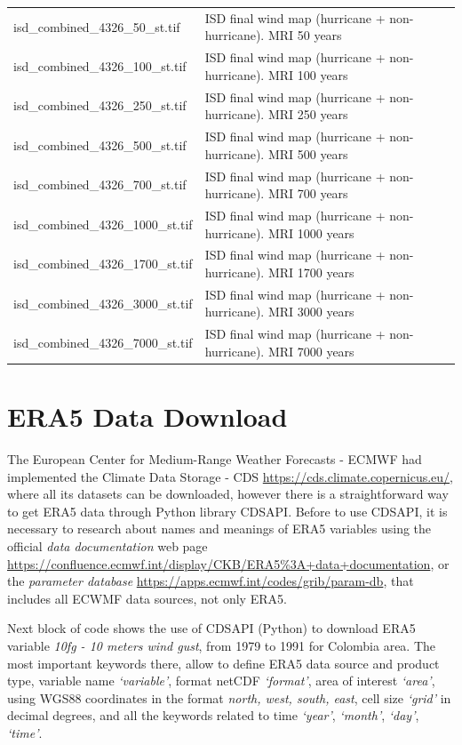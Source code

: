 \documentclass[12pt,oneside]{reedthesis}
\begin{document}
\begin{longtable}[t]{>{\raggedright\arraybackslash}p{2in}>{\raggedright\arraybackslash}p{3.5in}}
isd\_combined\_4326\_50\_st.tif & ISD final wind map (hurricane + non-hurricane). MRI 50 years\\
isd\_combined\_4326\_100\_st.tif & ISD final wind map (hurricane + non-hurricane). MRI 100 years\\
isd\_combined\_4326\_250\_st.tif & ISD final wind map (hurricane + non-hurricane). MRI 250 years\\
isd\_combined\_4326\_500\_st.tif & ISD final wind map (hurricane + non-hurricane). MRI 500 years\\
isd\_combined\_4326\_700\_st.tif & ISD final wind map (hurricane + non-hurricane). MRI 700 years\\
isd\_combined\_4326\_1000\_st.tif & ISD final wind map (hurricane + non-hurricane). MRI 1000 years\\
isd\_combined\_4326\_1700\_st.tif & ISD final wind map (hurricane + non-hurricane). MRI 1700 years\\
isd\_combined\_4326\_3000\_st.tif & ISD final wind map (hurricane + non-hurricane). MRI 3000 years\\
isd\_combined\_4326\_7000\_st.tif & ISD final wind map (hurricane + non-hurricane). MRI 7000 years\\
\bottomrule
\end{longtable}
\endgroup{}

\hypertarget{datadownload}{%
\chapter{ERA5 Data Download}\label{datadownload}}

The European Center for Medium-Range Weather Forecasts - ECMWF had implemented the Climate Data Storage - CDS \url{https://cds.climate.copernicus.eu/}, where all its datasets can be downloaded, however there is a straightforward way to get ERA5 data through Python library CDSAPI. Before to use CDSAPI, it is necessary to research about names and meanings of ERA5 variables using the official \emph{data documentation} web page \url{https://confluence.ecmwf.int/display/CKB/ERA5\%3A+data+documentation}, or the \emph{parameter database} \url{https://apps.ecmwf.int/codes/grib/param-db}, that includes all ECWMF data sources, not only ERA5.

Next block of code shows the use of CDSAPI (Python) to download ERA5 variable \emph{10fg - 10 meters wind gust}, from 1979 to 1991 for Colombia area. The most important keywords there, allow to define ERA5 data source and product type, variable name \emph{`variable'}, format netCDF \emph{`format'}, area of interest \emph{`area'}, using WGS88 coordinates in the format \emph{north, west, south, east}, cell size \emph{`grid'} in decimal degrees, and all the keywords related to time \emph{`year'}, \emph{`month'}, \emph{`day'}, \emph{`time'}.
\end{document}
